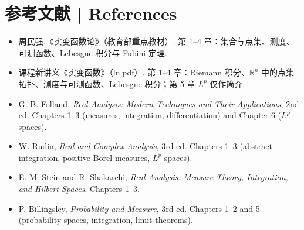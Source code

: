 \documentclass[UTF8,11pt,a4paper]{ctexart}
\begin{document}
\section*{参考文献 | References}
\begin{itemize}[leftmargin=1.6em,itemsep=2pt,topsep=3pt]
\item 周民强.《实变函数论》（教育部重点教材）. 第 1--4 章：集合与点集、测度、可测函数、Lebesgue 积分与 Fubini 定理.
\item 课程新讲义《实变函数》（ln.pdf）. 第 1--4 章：Riemann 积分、$\mathbb R^n$ 中的点集拓扑、测度与可测函数、Lebesgue 积分；第 5 章 $L^p$ 仅作简介.
\item G. B. Folland, \emph{Real Analysis: Modern Techniques and Their Applications}, 2nd ed. Chapters 1--3 (measures, integration, differentiation) and Chapter 6 ($L^p$ spaces).
\item W. Rudin, \emph{Real and Complex Analysis}, 3rd ed. Chapters 1--3 (abstract integration, positive Borel measures, $L^p$ spaces).
\item E. M. Stein and R. Shakarchi, \emph{Real Analysis: Measure Theory, Integration, and Hilbert Spaces}. Chapters 1--3.
\item P. Billingsley, \emph{Probability and Measure}, 3rd ed. Chapters 1--2 and 5 (probability spaces, integration, limit theorems).
\end{itemize}
\end{document}
